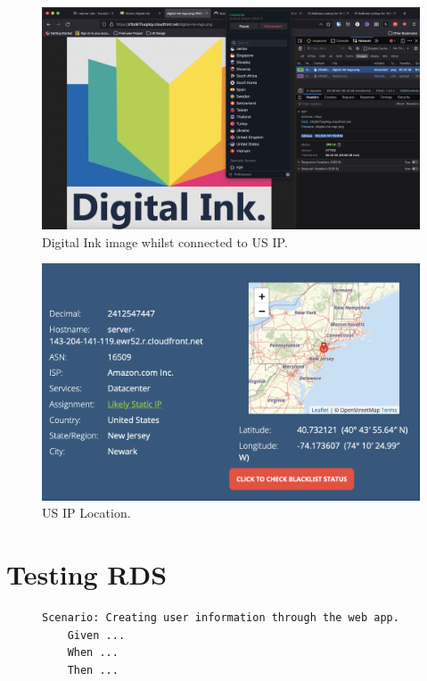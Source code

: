 \begin{figure}[!htbp]
    \centering
    \includegraphics[width=\textwidth]{resources/cloudfront/cloudfront-test-us}
    \caption{Digital Ink image whilst connected to US IP.}
    \label{fig:cloudfront-test-us}
\end{figure}

\begin{figure}[!htbp]
    \centering
    \includegraphics[width=\textwidth]{resources/cloudfront/cloudfront-test-us-ip}
    \caption{US IP Location.}
    \label{fig:cloudfront-test-us-ip}
\end{figure}

\clearpage

\section{Testing RDS}\label{sec:testing-rds}

\begin{figure}[!htbp]
    \centering
    \begin{verbatim}
Scenario: Creating user information through the web app.
    Given ...
    When ...
    Then ...
    \end{verbatim}
    \label{fig:create-user-data}
\end{figure}

